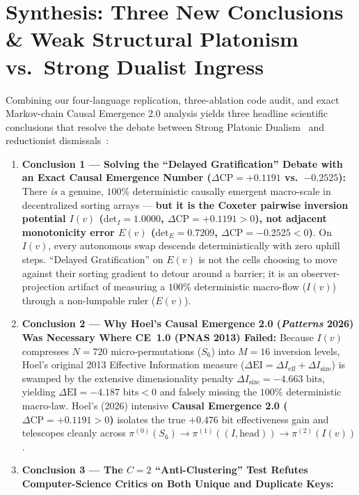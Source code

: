 \documentclass[11pt,a4paper]{article}
\theoremstyle{definition}
\theoremstyle{remark}
\begin{document}
\section{Synthesis: Three New Conclusions \& Weak Structural Platonism vs.\ Strong Dualist Ingress}

Combining our four-language replication, three-ablation code audit, and exact Markov-chain Causal Emergence 2.0 analysis yields three headline scientific conclusions that resolve the debate between Strong Platonic Dualism~\cite{Levin2025PsyArXiv,Levin2026Philosophies} and reductionist dismissals~\cite{Sweet2026}:

\begin{enumerate}
  \item \textbf{Conclusion 1 — Solving the ``Delayed Gratification'' Debate with an Exact Causal Emergence Number ($\Delta\mathrm{CP} = +0.1191$ vs.\ $-0.2525$):}
  There \emph{is} a genuine, $100\%$ deterministic causally emergent macro-scale in decentralized sorting arrays --- \textbf{but it is the Coxeter pairwise inversion potential $I(v)$ ($\mathrm{det}_I = 1.0000$, $\Delta\mathrm{CP} = +0.1191 > 0$), not adjacent monotonicity error $E(v)$ ($\mathrm{det}_E = 0.7209$, $\Delta\mathrm{CP} = -0.2525 < 0$)}. On $I(v)$, every autonomous swap descends deterministically with zero uphill steps. ``Delayed Gratification'' on $E(v)$ is not the cells choosing to move against their sorting gradient to detour around a barrier; it is an observer-projection artifact of measuring a $100\%$ deterministic macro-flow ($I(v)$) through a non-lumpable ruler ($E(v)$).
  \item \textbf{Conclusion 2 — Why Hoel's Causal Emergence 2.0 (\emph{Patterns} 2026) Was Necessary Where CE~1.0 (PNAS 2013) Failed:}
  Because $I(v)$ compresses $N = 720$ micro-permutations ($S_6$) into $M = 16$ inversion levels, Hoel's original 2013 Effective Information measure ($\Delta\mathrm{EI} = \Delta I_{\mathrm{eff}} + \Delta I_{\mathrm{size}}$) is swamped by the extensive dimensionality penalty $\Delta I_{\mathrm{size}} = -4.663\text{ bits}$, yielding $\Delta\mathrm{EI} = -4.187\text{ bits} < 0$ and falsely missing the $100\%$ deterministic macro-law. Hoel's (2026) intensive \textbf{Causal Emergence 2.0 ($\Delta\mathrm{CP} = +0.1191 > 0$)} isolates the true $+0.476\text{ bit}$ effectiveness gain and telescopes cleanly across $\pi^{(0)} (S_6) \to \pi^{(1)} ((I, \text{head})) \to \pi^{(2)} (I(v))$.
  \item \textbf{Conclusion 3 — The $C = 2$ ``Anti-Clustering'' Test Refutes Computer-Science Critics on Both Unique and Duplicate Keys:}

\end{enumerate}
\end{document}
